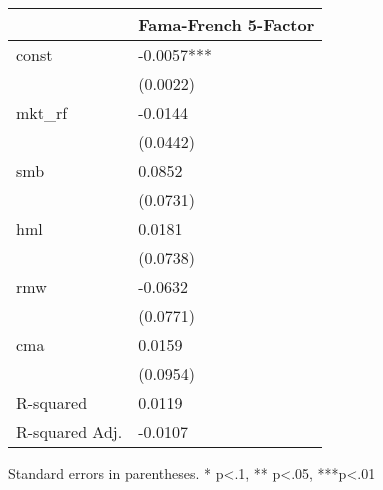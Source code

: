 \begin{table}
\caption{}
\label{}
\begin{center}
\begin{tabular}{ll}
\hline
               & Fama-French 5-Factor  \\
\hline
const          & -0.0057***            \\
               & (0.0022)              \\
mkt\_rf        & -0.0144               \\
               & (0.0442)              \\
smb            & 0.0852                \\
               & (0.0731)              \\
hml            & 0.0181                \\
               & (0.0738)              \\
rmw            & -0.0632               \\
               & (0.0771)              \\
cma            & 0.0159                \\
               & (0.0954)              \\
R-squared      & 0.0119                \\
R-squared Adj. & -0.0107               \\
\hline
\end{tabular}
\end{center}
\end{table}
\bigskip
Standard errors in parentheses. \newline 
* p<.1, ** p<.05, ***p<.01